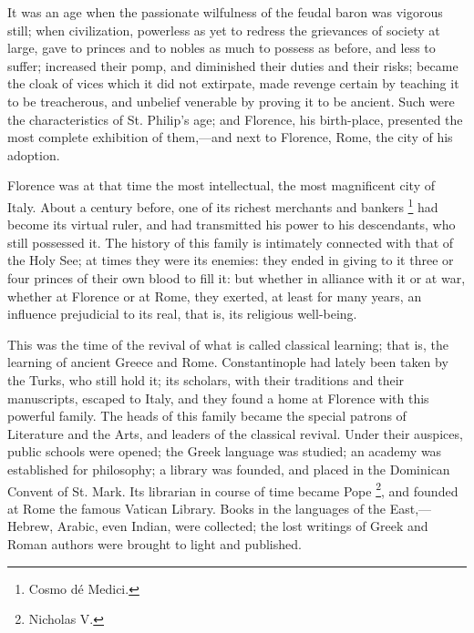 It was an age when the passionate wilfulness of the
feudal baron was vigorous still; when civilization,
powerless as yet to redress the grievances of society at
large, gave to princes and to nobles as much to possess
as before, and less to suffer; increased their pomp, and
diminished their duties and their risks; became the cloak
of vices which it did not extirpate, made revenge certain
by teaching it to be treacherous, and unbelief venerable
by proving it to be ancient. Such were the
characteristics of St. Philip's age; and Florence, his
birth-place, presented the most complete exhibition of
them,—and next to Florence, Rome, the city of his
adoption.

Florence was at that time the most intellectual, the
most magnificent city of Italy. About a century before,
one of its richest merchants and bankers \footnote{Cosmo dé
Medici.} had
become its virtual ruler, and had transmitted his power
to his descendants, who still possessed it. The history
of this family is intimately connected with that of the
Holy See; at times they were its enemies: they ended in
giving to it three or four princes of their own blood to
fill it: but whether in alliance with it or at war,
whether at Florence or at Rome, they exerted, at least
for many years, an influence prejudicial to its real,
that is, its religious well-being.

This was the time of the revival of what is called
classical learning; that is, the learning of ancient
Greece and Rome. Constantinople had lately been taken by
the Turks, who still hold it; its scholars, with their
traditions and their manuscripts, escaped to Italy, and
they found a home at Florence with this powerful family.
The heads of this family became the special patrons of
Literature and the Arts, and leaders of the classical
revival. Under their auspices, public schools were
opened; the Greek language was studied; an academy was
established for philosophy; a library was founded, and
placed in the Dominican Convent of St. Mark. Its
librarian in course of time became Pope \footnote{Nicholas
V.}, and
founded at Rome the famous Vatican Library. Books in the
languages of the East,—Hebrew, Arabic, even Indian,
were collected; the lost writings of Greek and Roman
authors were brought to light and published.

